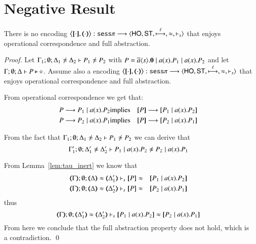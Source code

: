 \section{Negative Result}
\label{app:neg}

\begin{theorem}\rm
	There is no encoding $\enc{\cdot}{\cdot}: \sessp \longrightarrow \lrangle{\HO, \mathsf{ST}, \hby{\ell}, \wb, \proves_s}$
	that enjoys operational correspondence and full abstraction.
\end{theorem}

\begin{proof}
	Let $\Gamma_1; \emptyset; \Delta_1 \not\wb \Delta_2 \proves P_1 \not\wb P_2 $
	with $P = \overline{a} \langle s \rangle . \mathbf{0} \;|\; a (x) . P_1 \;|\; a (x) . P_2$ and
	let $\Gamma; \emptyset; \Delta \vdash P \triangleright \diamond$.
	Assume also a encoding
	$\enc{\cdot}{\cdot}: \sessp \longrightarrow \lrangle{\HO, \mathsf{ST}, \hby{\ell}, \wb, \proves_s}$
	that enjoys
	operational correspondence and full abstraction.

	From operational correspondence we get that:
	\begin{eqnarray*}
		P \red P_1 \Par \bacc{a}{x} P_2 &\textrm{implies}& \map{P} \red \map{P_1 \Par \bacc{a}{x} P_2}\\
		P \red P_2 \Par \bacc{a}{x} P_1 &\textrm{implies}& \map{P} \red \map{P_2 \Par \bacc{a}{x} P_1}
	\end{eqnarray*}

	From the fact that
	$\Gamma_1; \emptyset; \Delta_1 \not\wb \Delta_2 \proves P_1 \not\wb P_2$
	we can derive that
	\[
		\Gamma_1'; \emptyset; \Delta_1' \not\wb \Delta_2' \proves P_1 \Par \bacc{a}{x} P_2 \not\wb P_2 \Par \bacc{a}{x} P_1
	\]

	From Lemma~\ref{lem:tau_inert} we know that
	\begin{eqnarray*}
		\mapt{\Gamma}; \emptyset; \mapt{\Delta} \wb \mapt{\Delta_1'} \proves_s \map{P} &\wb& \map{P_1 \Par \bacc{a}{x} P_2}\\
		\mapt{\Gamma}; \emptyset; \mapt{\Delta} \wb \mapt{\Delta_2'} \proves_s \map{P} &\wb& \map{P_2 \Par \bacc{a}{x} P_1}
	\end{eqnarray*}
	\noi thus
	\[
		\mapt{\Gamma}; \emptyset; \mapt{\Delta_1'} \wb \mapt{\Delta_2'} \proves_s \map{P_1 \Par \bacc{a}{x} P_2} \wb \map{P_2 \Par \bacc{a}{x} P_1}
	\]
	From here we conclude that the full abstraction property does not hold,
	which is a contradiction.
	\qed
\end{proof}
